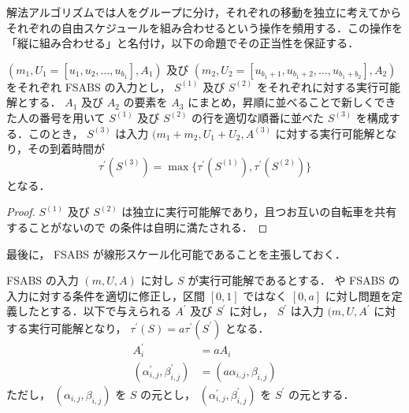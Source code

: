 解法アルゴリズムでは人をグループに分け，それぞれの移動を独立に考えてからそれぞれの自由スケジュールを組み合わせるという操作を頻用する．この操作を「縦に組み合わせる」と名付け，以下の命題でその正当性を保証する．
\begin{proposition}\label{proposition:vertical-composition}
  $(m_1, U_1 = [u_1, u_2, \ldots, u_{b_1}], A_1)$ 及び $(m_2, U_2 = [u_{b_1+1}, u_{b_1+2}, \ldots, u_{b_1+b_2}], A_2)$ をそれぞれ FSABS の入力とし， $S^{(1)}$ 及び $S^{(2)}$ をそれぞれに対する実行可能解とする． $A_1$ 及び $A_2$ の要素を $A_3$ にまとめ，昇順に並べることで新しくできた人の番号を用いて $S^{(1)}$ 及び $S^{(2)}$ の行を適切な順番に並べた $S^{(3)}$ を構成する．このとき， $S^{(3)}$ は入力 $(m_1 + m_2, U_1 + U_2, A^{(3)}$ に対する実行可能解となり，その到着時間が
  \begin{equation}
    \tau^\prime(S^{(3)}) = \max \{ \tau^\prime(S^{(1)}), \tau^\prime(S^{(2)}) \}
  \end{equation}
  となる．
\end{proposition}
\begin{proof}
  $S^{(1)}$ 及び $S^{(2)}$ は独立に実行可能解であり，且つお互いの自転車を共有することがないので  の条件は自明に満たされる．
\end{proof}

最後に， FSABS が線形スケール化可能であることを主張しておく．
\begin{claim}\label{claim:fsabs-scalable}
  FSABS の入力 $(m, U, A)$ に対し $S$ が実行可能解であるとする．  や FSABS の入力に対する条件を適切に修正し，区間 $[0, 1]$ ではなく $[0, a]$ に対し問題を定義したとする．以下で与えられる $A^\prime$ 及び $S^\prime$ に対し， $S^\prime$ は入力 $(m, U, A^\prime$ に対する実行可能解となり， $\tau^\prime(S) = a\tau^\prime(S^\prime)$ となる．
  \begin{align}
    A^\prime_i &= aA_i \\
    (\alpha^\prime_{i,j},\beta^\prime_{i,j}) &= (a\alpha_{i,j},\beta_{i,j})
  \end{align}
  ただし， $(\alpha_{i,j},\beta_{i,j})$ を $S$ の元とし， $(\alpha^\prime_{i,j},\beta^\prime_{i,j})$ を $S^\prime$ の元とする．
\end{claim}